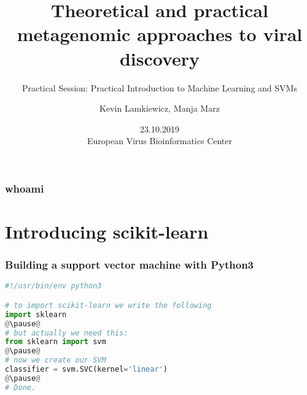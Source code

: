 

\title{Theoretical and practical metagenomic approaches to viral discovery}
\subtitle{Practical Session: Practical Introduction to Machine Learning and SVMs}
\author{Kevin Lamkiewicz, Manja Marz}
\date{23.10.2019\\[1em]European Virus Bioinformatics Center}



\begin{frame}
  \maketitle
\end{frame}

\begin{frame}[c]\frametitle{whoami}
\end{frame}

\section[sklearn]{Introducing scikit-learn}

\begin{frame}[c,fragile]\frametitle{Building a support vector machine with Python3}
  \begin{lstlisting}[language=Python]
#!/usr/bin/env python3

# to import scikit-learn we write the following
import sklearn
@\pause@
# but actually we need this:
from sklearn import svm
@\pause@
# now we create our SVM
classifier = svm.SVC(kernel='linear')
@\pause@
# Done.
  \end{lstlisting}
\end{frame}

